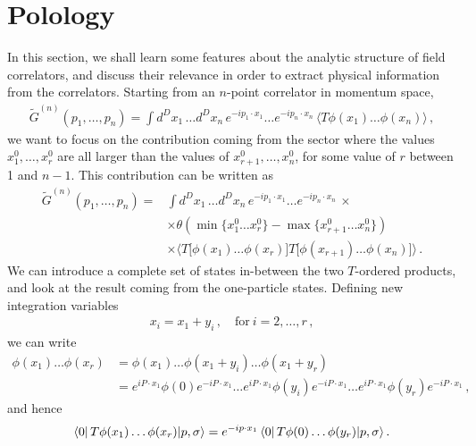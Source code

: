 \documentclass[notes]{subfiles}
\begin{document}
\section{Polology}
\label{sec:polology}

In this section, we shall learn some features about the analytic
structure of field correlators, and discuss their relevance in order
to extract physical information from the correlators. Starting from an
$n$-point correlator in momentum space,
\begin{align}
  \tilde{G}^{(n)}\left(p_1, \ldots, p_n\right) 
  = \int d^Dx_1\, \ldots d^Dx_n\, 
  e^{-i p_1\cdot x_1} \ldots e^{-i p_n\cdot x_n}\, 
  \langle T\phi(x_1) \ldots \phi(x_n)\rangle\, ,
\end{align}
we want to focus on the contribution coming from the sector where the
values $x_1^0, \ldots, x_r^0$ are all larger than the values of
$x_{r+1}^0, \ldots, x_n^0$, for some value of $r$ between 1 and
$n-1$. This contribution can be written as 
\begin{align}
  \tilde{G}^{(n)}\left(p_1, \ldots, p_n\right) 
  =& \int d^Dx_1\, \ldots d^Dx_n\, 
  e^{-i p_1\cdot x_1} \ldots e^{-i p_n\cdot x_n}\, \times \nonumber \\
   &\times \theta\left(
     \min\{x_1^0 \ldots x_r^0\} - \max\{x_{r+1}^0 \ldots x_n^0\}
     \right) \nonumber \\
   &\times \langle T\Big[\phi(x_1) \ldots \phi(x_r)\Big]
     T\Big[\phi(x_{r+1}) \ldots \phi(x_n)\Big]
     \rangle\, .
\end{align}
We can introduce a complete set of states in-between the two
$T$-ordered products, and look at the result coming from the
one-particle states. Defining new integration variables
\begin{align}
  x_i = x_1 + y_i\, , \quad \mathrm{for}\ i=2, \ldots, r\, ,
\end{align}
we can write
\begin{align}
  \phi(x_1) \ldots \phi(x_r) 
  &= \phi(x_1) \ldots \phi(x_1+y_i) \ldots \phi(x_1+y_r) \nonumber \\
  &= e^{i P\cdot x_1} \phi(0) e^{-i P\cdot x_1} \ldots e^{i P\cdot
    x_1} \phi(y_i) e^{-i P\cdot x_1} \ldots e^{i P\cdot x_1} \phi(y_r)
    e^{-i P\cdot x_1}\, ,
\end{align}
and hence
\begin{align}
  \bra{0} T \phi(x_1) \ldots \phi(x_r) | p,\sigma\rangle = 
  e^{-i p \cdot x_1}  \bra{0} T \phi(0) \ldots \phi(y_r) |
  p,\sigma\rangle\, .
\end{align}
\end{document}
